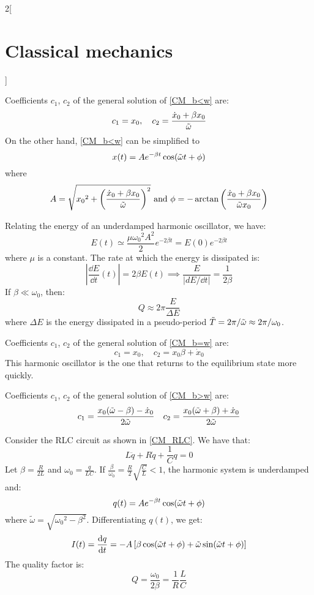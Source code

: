 \documentclass[../../../main_physics.tex]{subfiles}
\begin{document}
\begin{multicols}{2}[\section{Classical mechanics}]
  \begin{proposition}
    Coefficients $c_1$, $c_2$ of the general solution of \cref{CM_b<w} are: $$c_1=x_0,\quad c_2=\frac{\dot{x}_0+\beta x_0}{\Tilde{\omega}}$$ On the other hand, \cref{CM_b<w} can be simplified to $$x(t)=Ae^{-\beta t}\cos(\Tilde{\omega}t+\phi)$$ where $$A=\sqrt{{x_0}^2+{\left(\frac{\dot{x}_0+\beta x_0}{\Tilde{\omega}}\right)}^2}\text{ and }\phi=-\arctan\left(\frac{\dot{x}_0+\beta x_0}{\Tilde{\omega}x_0}\right)$$
  \end{proposition}
  \begin{proposition}
    Relating the energy of an underdamped harmonic oscillator, we have:
    $$E(t)\simeq\frac{\mu{\omega_0}^2A^2}{2}e^{-2\beta t}=E(0)e^{-2\beta t}$$ where $\mu$ is a constant. The rate at which the energy is dissipated is: $$\left|\frac{\dd{E}}{\dd{t}}(t)\right|=2\beta E(t)\implies\frac{E}{\left|dE/\dd{t}\right|}=\frac{1}{2\beta}$$
    If $\beta\ll\omega_0$, then: $$Q\approx 2\pi\frac{E}{\Delta E}$$ where $\Delta E$ is the energy dissipated in a pseudo-period $\Tilde{T}=2\pi/\Tilde{\omega}\approx2\pi/\omega_0$.
  \end{proposition}
  \begin{proposition}[Critically damped harmonic oscillator: $\beta=\omega_0$]
    Coefficients $c_1$, $c_2$ of the general solution of \cref{CM_b=w} are: $$c_1=x_0,\quad c_2=x_0\beta+\dot{x}_0$$ This harmonic oscillator is the one that returns to the equilibrium state more quickly.
  \end{proposition}
  \begin{proposition}
    Coefficients $c_1$, $c_2$ of the general solution of \cref{CM_b>w} are: $$c_1=\frac{x_0(\Tilde{\omega}-\beta)-\dot{x}_0}{2\Tilde{\omega}}\quad c_2=\frac{x_0(\Tilde{\omega}+\beta)+\dot{x}_0}{2\Tilde{\omega}}$$
  \end{proposition}
  \begin{proposition}
    Consider the RLC circuit as shown in \cref{CM_RLC}. We have that:
    $$L\ddot{q}+R\dot{q}+\frac{1}{C}q=0$$ Let $\beta=\frac{R}{2L}$ and $\omega_0=\frac{q}{LC}$. If $\frac{\beta}{\omega_0}=\frac{R}{2}\sqrt{\frac{C}{L}}<1$, the harmonic system is underdamped and: $$q(t)=Ae^{-\beta t}\cos(\Tilde{\omega}t+\phi)$$ where $\tilde{\omega}=\sqrt{{\omega_0}^2-\beta^2}$. Differentiating $q(t)$, we get: $$I(t)=\dv{q}{t}(t)=-A\left[\beta\cos(\Tilde{\omega}t+\phi)+\Tilde{\omega}\sin(\Tilde{\omega}t+\phi)\right]$$ The quality factor is: $$Q=\frac{\omega_0}{2\beta}=\frac{1}{R}\frac{L}{C}$$
    \begin{center}
      \begin{minipage}{\linewidth}
        \centering
        
        \label{CM_RLC}
      \end{minipage}
    \end{center}
  \end{proposition}

\end{multicols}
\end{document}
